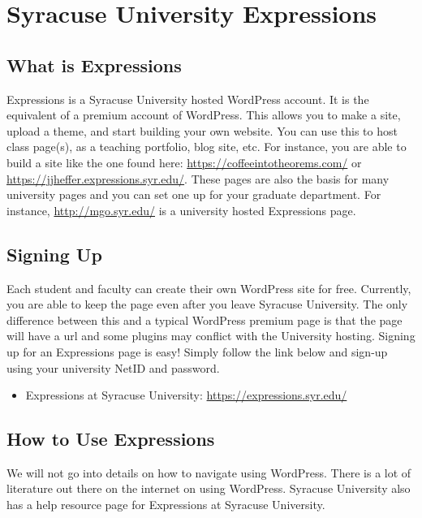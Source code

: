 \newpage
\section{Syracuse University Expressions}

\subsection{What is Expressions}

Expressions is a Syracuse University hosted WordPress account. It is the equivalent of a premium account of WordPress. This allows you to make a site, upload a theme, and start building your own website. You can use this to host class page(s), as a teaching portfolio, blog site, etc. For instance, you are able to build a site like the one found here: \url{https://coffeeintotheorems.com/} or \url{https://jjheffer.expressions.syr.edu/}. These pages are also the basis for many university pages and you can set one up for your graduate department. For instance, \url{http://mgo.syr.edu/} is a university hosted Expressions page. 



\subsection{Signing Up}

Each student and faculty can create their own WordPress site for free. Currently, you are able to keep the page even after you leave Syracuse University. The only difference between this and a typical WordPress premium page is that the page will have a  url and some plugins may conflict with the University hosting. Signing up for an Expressions page is easy! Simply follow the link below and sign-up using your university NetID and password.

	\begin{itemize}
	\item Expressions at Syracuse University: \url{https://expressions.syr.edu/}
	\end{itemize}


\subsection{How to Use Expressions}

We will not go into details on how to navigate using WordPress. There is a lot of literature out there on the internet on using WordPress. Syracuse University also has a help resource page for Expressions at Syracuse University. 

